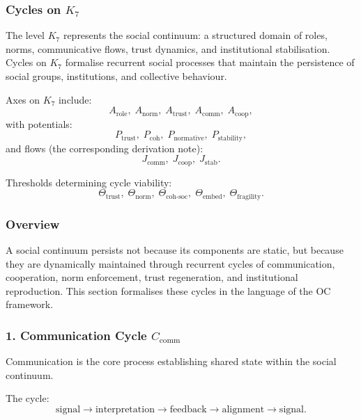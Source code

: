 
\subsubsection{Cycles on \texorpdfstring{$K_7$}{K_7}}
\label{sec:cycles-k7}

The level $K_7$ represents the social continuum: a structured domain of
roles, norms, communicative flows, trust dynamics, and institutional
stabilisation.  
Cycles on $K_7$ formalise recurrent social processes that maintain the
persistence of social groups, institutions, and collective behaviour.

Axes on $K_7$ include:
\[
  A_{\mathrm{role}},\;
  A_{\mathrm{norm}},\;
  A_{\mathrm{trust}},\;
  A_{\mathrm{comm}},\;
  A_{\mathrm{coop}},
\]
with potentials:
\[
  P_{\mathrm{trust}},\;
  P_{\mathrm{coh}},\;
  P_{\mathrm{normative}},\;
  P_{\mathrm{stability}},
\]
and flows (the corresponding derivation note):
\[
  J_{\mathrm{comm}},\;
  J_{\mathrm{coop}},\;
  J_{\mathrm{stab}}.
\]

Thresholds determining cycle viability:
\[
  \Theta_{\mathrm{trust}},\;
  \Theta_{\mathrm{norm}},\;
  \Theta_{\mathrm{coh\text{-}soc}},\;
  \Theta_{\mathrm{embed}},\;
  \Theta_{\mathrm{fragility}}.
\]

\subsubsection{Overview}

A social continuum persists not because its components are static, but because
they are dynamically maintained through recurrent cycles of communication,
cooperation, norm enforcement, trust regeneration, and institutional
reproduction.  
This section formalises these cycles in the language of the OC framework.

\subsubsection{1. Communication Cycle $C_{\mathrm{comm}}$}

Communication is the core process establishing shared state within the social
continuum.

The cycle:
\[
  \mathrm{signal}
  \to
  \mathrm{interpretation}
  \to
  \mathrm{feedback}
  \to
  \mathrm{alignment}
  \to
  \mathrm{signal}.
\]

